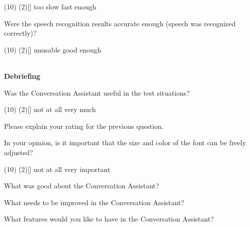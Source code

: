 \documentclass[english, 12pt, a4paper, pdftex, elec, utf8]{aaltothesis}
\begin{document}
{\begin{questionnaire}[resume]
        \begin{tasks}[](10)
            \task*(2)[] too slow
            \task[] fast enough
        \end{tasks}
        \item Were the speech recognition results accurate enough (speech was recognized correctly)?
        \begin{tasks}[](10)
            \task*(2)[] unusable
            \task[] good enough \\\\
        \end{tasks}
    \end{questionnaire}
    \noindent
    \hspace{0.35cm}
    \textbf{Debriefing}
    \vspace{0.15cm} 
    \begin{questionnaire}[resume]
        \item Was the Conversation Assistant useful in the test situations?
        \begin{tasks}[](10)
            \task*(2)[] not at all
            \task[] very much
        \end{tasks}
        \item Please explain your rating for the previous question.
        \item In your opinion, is it important that the size and color of the font can be freely adjusted?
        \begin{tasks}[](10)
            \task*(2)[] not at all
            \task[] very important
        \end{tasks}
        \item What was good about the Conversation Assistant?
        \item What needs to be improved in the Conversation Assistant?
        \item What features would you like to have in the Conversation Assistant?

\end{questionnaire}}
\end{document}
